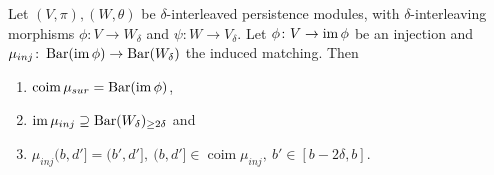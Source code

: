 \begin{lemma} \label{lemma:inj-image}
    Let $ (V, \pi), (W, \theta) $ be $\delta$-interleaved persistence modules, with $\delta$-inter\-leaving morphisms $ \phi\colon V \to W_\delta $ and $ \psi\colon W \to V_\delta $. Let $ \phi\colon V \to \operatorname{im}\phi $ be an injection and $ \mu_{inj}\colon \operatorname{Bar}(\operatorname{im} \phi) \to \operatorname{Bar} (W_\delta)$ the induced matching. Then
    \begin{enumerate}
        \item $\operatorname{coim} \mu_{sur} = \operatorname{Bar} (\operatorname{im} \phi) $,
        \item $ \operatorname{im} \mu_{inj} \supseteq \operatorname{Bar} (W_\delta)_{\geq 2\delta} $ and
        \item $ \mu_{inj}(b, d'] = (b', d'], \ (b, d'] \in \operatorname{coim} \mu_{inj}, \ b' \in [b-2\delta, b]$.
    \end{enumerate}
\end{lemma}
